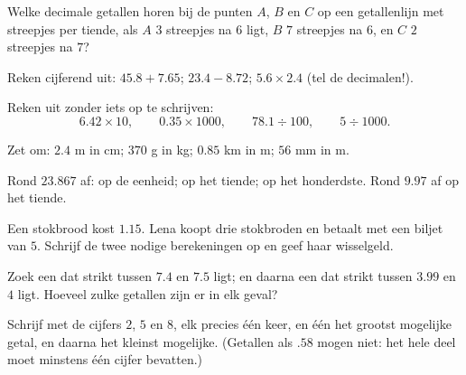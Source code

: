 \begin{exercise}[$\star$]\label{exo:g6:decimals:5}
Welke decimale getallen horen bij de punten $A$, $B$ en $C$ op een
getallenlijn met streepjes per tiende, als $A$ $3$ streepjes na $6$ ligt, $B$
$7$ streepjes na $6$, en $C$ $2$ streepjes na $7$?
\end{exercise}

\begin{exercise}[$\star$]\label{exo:g6:decimals:6}
Reken cijferend uit: $45.8 + 7.65$; \quad $23.4 - 8.72$; \quad
$5.6 \times 2.4$ (tel de decimalen!).
\end{exercise}

\begin{exercise}[$\star$]\label{exo:g6:decimals:7}
Reken uit zonder iets op te schrijven:
\[
6.42 \times 10, \qquad
0.35 \times 1000, \qquad
78.1 \div 100, \qquad
5 \div 1000 .
\]
\end{exercise}

\begin{exercise}[$\star$]\label{exo:g6:decimals:8}
Zet om: $2.4$ m in cm; \quad $370$ g in kg; \quad $0.85$ km in m; \quad
$56$ mm in m.
\end{exercise}

\begin{exercise}[$\star$]\label{exo:g6:decimals:9}
Rond $23.867$ af: op de eenheid; op het tiende; op het honderdste. Rond
$9.97$ af op het tiende.
\end{exercise}

\begin{exercise}[$\star\star$]\label{exo:g6:decimals:10}
Een stokbrood kost $1.15$. Lena koopt drie stokbroden en betaalt met een
biljet van $5$. Schrijf de twee nodige berekeningen op en geef haar
wisselgeld.
\end{exercise}

\begin{exercise}[$\star\star$]\label{exo:g6:decimals:11}
Zoek een  dat strikt tussen $7.4$ en $7.5$ ligt; en daarna een
dat strikt tussen $3.99$ en $4$ ligt. Hoeveel zulke getallen zijn er in elk
geval?
\end{exercise}

\begin{exercise}[$\star\star\star$]\label{exo:g6:decimals:12}
Schrijf met de cijfers $2$, $5$ en $8$, elk precies één keer, en één
 het grootst mogelijke getal, en daarna het kleinst mogelijke.
(Getallen als $.58$ mogen niet: het hele deel moet minstens één cijfer
bevatten.)
\end{exercise}

